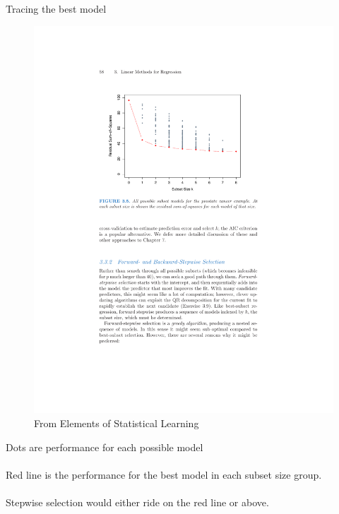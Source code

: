 \documentclass[mathserif, aspectratio=169]{beamer}
\begin{document}
\begin{frame}{Tracing the best model}

\begin{figure}
\includegraphics[scale=0.55]{subset_surfing}
\caption*{\tiny From Elements of Statistical Learning}
\end{figure}

Dots are performance for each possible model\\~\\

Red line is the performance for the best model in each subset size group.\\~\\

Stepwise selection would either ride on the red line or above.  
\end{frame}


\end{document}

